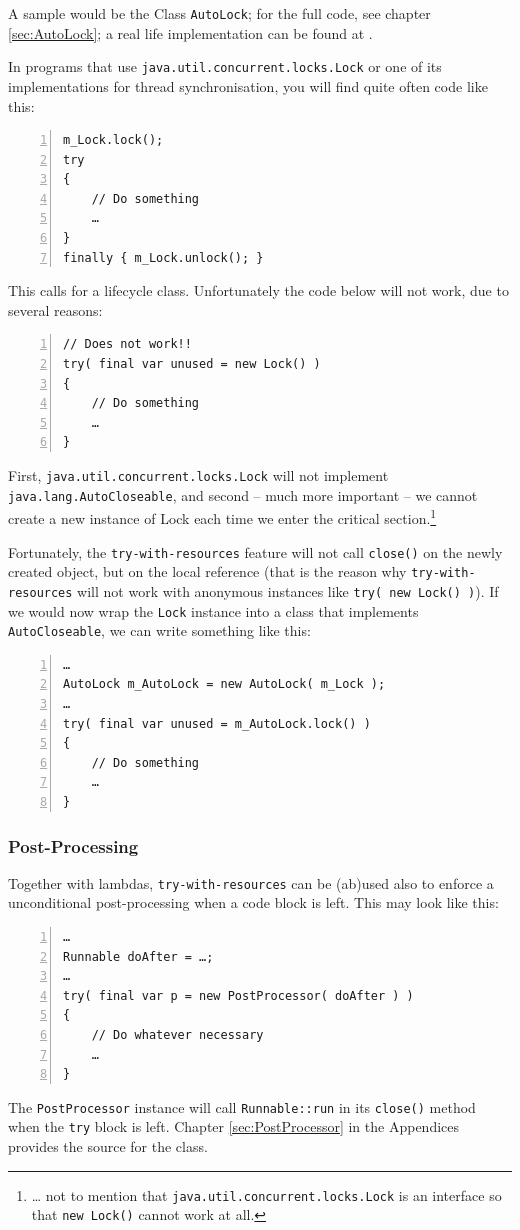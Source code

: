 \documentclass[12pt,a4paper,titlepage, parskip=half, headsepline, footsepline, cleardoubleplain]{scrbook}
\begin{document}
A sample would be the Class \lstinline|AutoLock|; for the full code, see chapter \vref{sec:AutoLock}; a real life implementation can be found at \autocite{TQUADRAT_ORG_FOUNDATION_AUTOLOCK}.

In programs that use \lstinline|java.util.concurrent.locks.Lock| or one of its implementations for thread synchronisation, you will find quite often code like this:
\begin{lstlisting}[numbers=left]
m_Lock.lock();
try
{
    // Do something
    …
}
finally { m_Lock.unlock(); }
\end{lstlisting}

This calls for a lifecycle class. Unfortunately the code below will not work, due to several reasons:
\begin{lstlisting}[numbers=left]
// Does not work!!
try( final var unused = new Lock() )
{
    // Do something
    …
}
\end{lstlisting}

First, \lstinline|java.util.concurrent.locks.Lock| will not implement \lstinline|java.lang.AutoCloseable|, and second – much more important – we cannot create a new instance of Lock each time we enter the critical section.\footnote{… not to mention that \lstinline|java.util.concurrent.locks.Lock| is an interface so that \lstinline|new Lock()| cannot work at all.}

Fortunately, the \lstinline|try-with-resources| feature will not call \lstinline|close()| on the newly created object, but on the local reference (that is the reason why \lstinline|try-with-resources| will not work with anonymous instances like \lstinline|try( new Lock() )|). If we would now wrap the \lstinline|Lock| instance into a class that implements \lstinline|AutoCloseable|, we can write something like this:
\begin{lstlisting}[numbers=left]
…
AutoLock m_AutoLock = new AutoLock( m_Lock );
…
try( final var unused = m_AutoLock.lock() )
{
    // Do something
    …
}
\end{lstlisting}

\subsubsection{Post-Processing}
Together with lambdas, \lstinline|try-with-resources| can be (ab)used also to enforce a unconditional post-processing when a code block is left. This may look like this:
\begin{lstlisting}[numbers=left]
…
Runnable doAfter = …;
…
try( final var p = new PostProcessor( doAfter ) )
{
    // Do whatever necessary
    …
}
\end{lstlisting}
The \lstinline|PostProcessor| instance will call \lstinline|Runnable::run| in its \lstinline|close()| method when the \lstinline|try| block is left. Chapter \ref{sec:PostProcessor} in the Appendices provides the source for the class.
\end{document}
